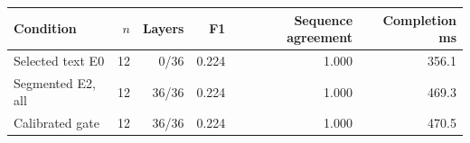 \begin{tabular}{lrrrrr}
\toprule
Condition & $n$ & Layers & F1 & Sequence agreement & Completion ms \\
\midrule
Selected text E0 & 12 & 0/36 & 0.224 & 1.000 & 356.1 \\
Segmented E2, all & 12 & 36/36 & 0.224 & 1.000 & 469.3 \\
Calibrated gate & 12 & 36/36 & 0.224 & 1.000 & 470.5 \\
\bottomrule
\end{tabular}
